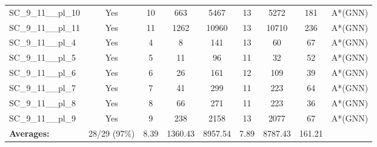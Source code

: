 \documentclass{article}
\begin{document}
\begin{tabular}{lcccccccc}
SC\_9\_11\_\_pl\_10 & Yes & 10 & 663 & 5467 & 13 & 5272 & 181 & A*(GNN) \\
SC\_9\_11\_\_pl\_11 & Yes & 11 & 1262 & 10960 & 13 & 10710 & 236 & A*(GNN) \\
SC\_9\_11\_\_pl\_4 & Yes & 4 & 8 & 141 & 13 & 60 & 67 & A*(GNN) \\
SC\_9\_11\_\_pl\_5 & Yes & 5 & 11 & 96 & 11 & 32 & 52 & A*(GNN) \\
SC\_9\_11\_\_pl\_6 & Yes & 6 & 26 & 161 & 12 & 109 & 39 & A*(GNN) \\
SC\_9\_11\_\_pl\_7 & Yes & 7 & 41 & 299 & 11 & 223 & 64 & A*(GNN) \\
SC\_9\_11\_\_pl\_8 & Yes & 8 & 66 & 271 & 11 & 223 & 36 & A*(GNN) \\
SC\_9\_11\_\_pl\_9 & Yes & 9 & 238 & 2158 & 13 & 2077 & 67 & A*(GNN) \\
\textbf{Averages:} & 28/29 (97\%) & 8.39 & 1360.43 & 8957.54 & 7.89 & 8787.43 & 161.21 & \\
\bottomrule
\end{tabular}
\\[0.7cm]
\end{document}
